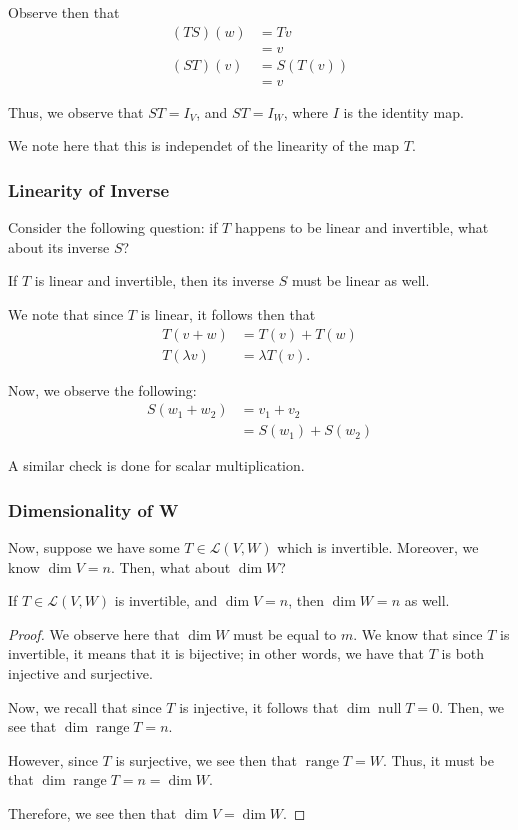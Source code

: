 \documentclass[openany]{book}
\DeclareMathOperator*{\vnull}{null}
\DeclareMathOperator*{\vrange}{range}
\begin{document}
Observe then that
\begin{align*}
	(TS)(w) &= Tv \\
	&= v
	\\
	(ST)(v) &= S(T(v)) \\
	&= v
\end{align*}

Thus, we observe that $ST = I_{V}$, and $ST = I_{W}$, where $I$ is the identity map.

\begin{rmk}
	We note here that this is independet of the linearity of the map $T$.
\end{rmk}

\subsubsection{Linearity of Inverse}
Consider the following question: if $T$ happens to be linear and invertible, what about its inverse $S$?

\begin{thm}
	If $T$ is linear and invertible, then its inverse $S$ must be linear as well.
\end{thm}

We note that since $T$ is linear, it follows then that
\begin{align*}
	T(v+w) &= T(v) + T(w) \\
	T(\lambda v) &= \lambda T(v).
\end{align*}

Now, we observe the following:
\begin{align*}
	S(w_{1}+w_{2}) &= v_{1} + v_{2} \\
	&= S(w_{1}) + S(w_{2})
\end{align*}

A similar check is done for scalar multiplication.

\subsubsection{Dimensionality of W}
Now, suppose we have some $T \in \mathcal L(V,W)$ which is invertible. Moreover, we know $\dim V = n$. Then, what about $\dim W$?

\begin{thm}
	If $T \in \mathcal L(V,W)$ is invertible, and $\dim V = n$, then $\dim W = n$ as well.
\end{thm}
\begin{proof}
	We observe here that $\dim W$ must be equal to $m$. We know that since $T$ is invertible, it means that it is bijective; in other words, we have that $T$ is both injective and surjective.
	
	Now, we recall that since $T$ is injective, it follows that $\dim \vnull T = 0$. Then, we see that $\dim \vrange T = n$.
	
	However, since $T$ is surjective, we see then that $\vrange T = W$. Thus, it must be that $\dim \vrange T = n = \dim W$.
	
	Therefore, we see then that $\dim V = \dim W$.
\end{proof}
\end{document}
